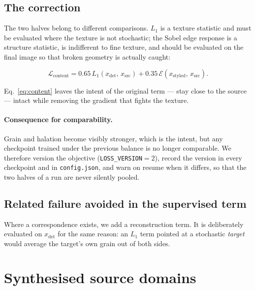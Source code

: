 \documentclass[11pt,a4paper]{article}
\newcommand{\code}[1]{\texttt{#1}}
\begin{document}
\subsection{The correction}

The two halves belong to different comparisons. $L_1$ is a texture statistic and
must be evaluated where the texture is not stochastic; the Sobel edge response
is a structure statistic, is indifferent to fine texture, and should be
evaluated on the final image so that broken geometry is actually caught:

\begin{equation}
  \mathcal{L}_{\mathrm{content}}
    = 0.65\, L_1\!\left(x_{\text{det}},\, x_{\text{src}}\right)
    + 0.35\, \mathcal{E}\!\left(x_{\text{styled}},\, x_{\text{src}}\right).
  \label{eq:content}
\end{equation}

Eq.~\eqref{eq:content} leaves the intent of the original term --- stay close to
the source --- intact while removing the gradient that fights the texture.

\paragraph{Consequence for comparability.} Grain and halation become visibly
stronger, which is the intent, but any checkpoint trained under the previous
balance is no longer comparable. We therefore version the objective
(\code{LOSS\_VERSION}$=2$), record the version in every checkpoint and in
\code{config.json}, and warn on resume when it differs, so that the two halves of
a run are never silently pooled.

\subsection{Related failure avoided in the supervised term}

Where a correspondence exists, we add a reconstruction term. It is deliberately
evaluated on $x_{\text{det}}$ for the same reason: an $L_1$ term pointed at a
stochastic \emph{target} would average the target's own grain out of both sides.

\section{Synthesised source domains}
\label{sec:degrade}
\end{document}

